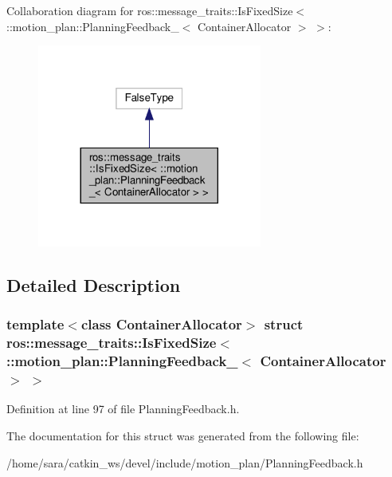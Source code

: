 Collaboration diagram for ros\+:\+:message\+\_\+traits\+:\+:Is\+Fixed\+Size$<$ \+:\+:motion\+\_\+plan\+:\+:Planning\+Feedback\+\_\+$<$ Container\+Allocator $>$ $>$\+:
\nopagebreak
\begin{figure}[H]
\begin{center}
\leavevmode
\includegraphics[width=209pt]{structros_1_1message__traits_1_1IsFixedSize_3_01_1_1motion__plan_1_1PlanningFeedback___3_01Contaa1586a78de33c2fc35c3b286a6439eb1}
\end{center}
\end{figure}


\subsection{Detailed Description}
\subsubsection*{template$<$class Container\+Allocator$>$\newline
struct ros\+::message\+\_\+traits\+::\+Is\+Fixed\+Size$<$ \+::motion\+\_\+plan\+::\+Planning\+Feedback\+\_\+$<$ Container\+Allocator $>$ $>$}



Definition at line 97 of file Planning\+Feedback.\+h.



The documentation for this struct was generated from the following file\+:\begin{DoxyCompactItemize}
\item 
/home/sara/catkin\+\_\+ws/devel/include/motion\+\_\+plan/Planning\+Feedback.\+h\end{DoxyCompactItemize}
